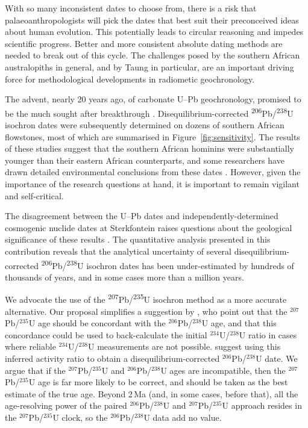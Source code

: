 \documentclass[11pt]{article}
\begin{document}
With so many inconsistent dates to choose from, there is a risk that
palaeoanthropologists will pick the dates that best suit their
preconceived ideas about human evolution. This potentially leads to
circular reasoning and impedes scientific progress. Better and more
consistent absolute dating methods are needed to break out of this
cycle. The challenges posed by the southern African australopiths in
general, and by Taung in particular, are an important driving force
for methodological developments in radiometic geochronology.

The advent, nearly 20 years ago, of carbonate U--Pb geochronology,
promised to be the much sought after breakthrough \citep{walker2006}.
Disequilibrium-corrected
\textsuperscript{206}Pb/\textsuperscript{238}U isochron dates were
subsequently determined on dozens of southern African flowstones, most
of which are summarised in Figure~\ref{fig:sensitivity}. The results
of these studies suggest that the southern African hominins were
substantially younger than their eastern African counterparts, and
some researchers have drawn detailed environmental conclusions from
these dates \citep{pickering2019}. However, given the importance of
the research questions at hand, it is important to remain vigilant and
self-critical.

The disagreement between the U--Pb dates and independently-determined
cosmogenic nuclide dates at Sterkfontein raises questions about the
geological significance of these results
\citep{granger2015,kramers2017,granger2022}. The quantitative analysis
presented in this contribution reveals that the analytical uncertainty
of several disequilibrium-corrected
\textsuperscript{206}Pb/\textsuperscript{238}U isochron dates has been
under-estimated by hundreds of thousands of years, and in some cases
more than a million years.

We advocate the use of the
\textsuperscript{207}Pb/\textsuperscript{235}U isochron method as a
more accurate alternative. Our proposal simplifies a suggestion by
\citet{engel2019}, who point out that the ${}^{207}$Pb/${}^{235}$U age
should be concordant with the ${}^{206}$Pb/${}^{238}$U age, and that
this concordance could be used to back-calculate the initial
${}^{234}$U/${}^{238}$U ratio in cases where reliable
${}^{234}$U/${}^{238}$U measurements are not possible.
\citet{engel2019} suggest using this inferred activity ratio to obtain
a disequilibrium-corrected ${}^{206}$Pb/${}^{238}$U date.  We argue
that if the ${}^{207}$Pb/${}^{235}$U and ${}^{206}$Pb/${}^{238}$U ages
are incompatible, then the ${}^{207}$Pb/${}^{235}$U age is far more
likely to be correct, and should be taken as the best estimate of the
true age.  Beyond 2\,Ma (and, in some cases, before that), all the
age-resolving power of the paired ${}^{206}$Pb/${}^{238}$U and
${}^{207}$Pb/${}^{235}$U approach resides in the
${}^{207}$Pb/${}^{235}$U clock, so the ${}^{206}$Pb/${}^{238}$U data
add no value.
\end{document}

